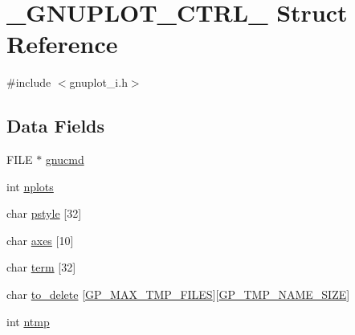 \hypertarget{struct__GNUPLOT__CTRL__}{\section{\-\_\-\-G\-N\-U\-P\-L\-O\-T\-\_\-\-C\-T\-R\-L\-\_\- Struct Reference}
\label{struct__GNUPLOT__CTRL__}
}


{\ttfamily \#include $<$gnuplot\-\_\-i.\-h$>$}

\subsection*{Data Fields}
\begin{DoxyCompactItemize}
\item 
F\-I\-L\-E $\ast$ \hyperlink{struct__GNUPLOT__CTRL___aa7a57db92f1f9455de4d6bba134b4824}{gnucmd}
\item 
int \hyperlink{struct__GNUPLOT__CTRL___a5b06b0488db37f772b916098c0abd354}{nplots}
\item 
char \hyperlink{struct__GNUPLOT__CTRL___a469437799a4bf7383bdbabac2590a7ba}{pstyle} \mbox{[}32\mbox{]}
\item 
char \hyperlink{struct__GNUPLOT__CTRL___acba90dc81e974a596a22042d11a6b6f8}{axes} \mbox{[}10\mbox{]}
\item 
char \hyperlink{struct__GNUPLOT__CTRL___a0b75d835feb60e339aa3437aaa5c548a}{term} \mbox{[}32\mbox{]}
\item 
char \hyperlink{struct__GNUPLOT__CTRL___a97b62dbc77e2491651700c17c8c25551}{to\-\_\-delete} \mbox{[}\hyperlink{gnuplot__i_8h_a0b92738856c4bda43003d1c847483dd2}{G\-P\-\_\-\-M\-A\-X\-\_\-\-T\-M\-P\-\_\-\-F\-I\-L\-E\-S}\mbox{]}\mbox{[}\hyperlink{gnuplot__i_8h_a093b4c5627360601a4605251ed3495c8}{G\-P\-\_\-\-T\-M\-P\-\_\-\-N\-A\-M\-E\-\_\-\-S\-I\-Z\-E}\mbox{]}
\item 
int \hyperlink{struct__GNUPLOT__CTRL___a88196f871d2e10a48c16f7539a04b7c1}{ntmp}
\end{DoxyCompactItemize}


